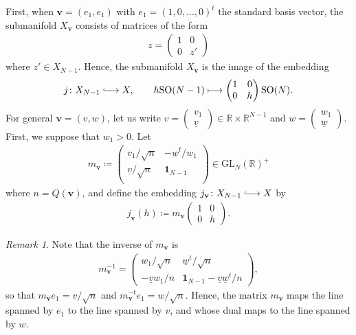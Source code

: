 \documentclass[a4paper,11pt]{amsart} %
\newcommand{\8}{\infty}
\newcommand{\id}{\mathbf{1}}
\newcommand{\wud}{\underline{w}}
\newcommand{\vud}{\underline{v}}
\newcommand{\vbf}{\mathbf{v}}
\newcommand{\SO}{\mathrm{SO}}
\newcommand{\GL}{\mathrm{GL}}
\newcommand{\R}{\mathbb{R}}
\newcommand{\hooklongrightarrow}{\lhook\joinrel\longrightarrow}
\theoremstyle{mytheoremstyle}
\theoremstyle{remark}
\newtheorem{rmk}{Remark}[section]
\numberwithin{equation}{section}
\begin{document}
First, when $\vbf=(e_1,e_1)$ with $e_1=(1,0,\dots,0)^t$ the standard basis vector, the submanifold $X_\vbf$ consists of matrices of the form
\begin{align}
    z=\begin{pmatrix}
        1 & 0 \\ 0 & z'
    \end{pmatrix}
\end{align}
where $z' \in X_{N-1}$. Hence, the submanifold $X_\vbf$ is the image of the embedding
\begin{align} \label{jemb}
    j \colon X_{N-1} \hooklongrightarrow X, \qquad
    h\SO(N-1)  \longmapsto \begin{pmatrix}1 & 0 \\ 0 & h
    \end{pmatrix}\SO(N).
\end{align}
For general $\vbf=(v,w)$, let us write $v=\begin{pmatrix} v_1 \\ \vud \end{pmatrix} \in \R \times \R^{N-1}$ and $w=\begin{pmatrix} w_1 \\ \wud \end{pmatrix}$. First, we suppose that $w_1>0$. Let 
\begin{align}
    m_{\vbf} \coloneqq \begin{pmatrix} 
    v_1/\sqrt{n} & -\wud^t/w_1 \\
 \vud/\sqrt{n} & \id_{N-1} \\
    \end{pmatrix} \in \GL_N(\R)^+
\end{align}
where $n=Q(\vbf)$, and define the embedding $j_\vbf \colon X_{N-1} \hooklongrightarrow X$ by
\begin{align} \label{jemb2}
j_{\vbf}(h) \coloneqq m_\vbf \begin{pmatrix}1 & 0 \\ 0 & h\end{pmatrix}.
\end{align}
\begin{rmk}
Note that the inverse of $m_\vbf$ is 
\begin{align} \label{mvprop}
    m_\vbf^{-1}=\begin{pmatrix} w_1/\sqrt{n} & \wud^t/\sqrt{n} \\
    -\vud w_1/n & \id_{N-1}-\vud \wud^t/n
    \end{pmatrix},
\end{align}
so that $m_\vbf e_1= v/\sqrt{n}$ and $m_\vbf^{-t}e_1=w/\sqrt{n}$. Hence, the matrix $m_\vbf$ maps the line spanned by $e_1$ to the line spanned by $v$, and whose dual maps to the line spanned by $w$.
\end{rmk}
\end{document}
